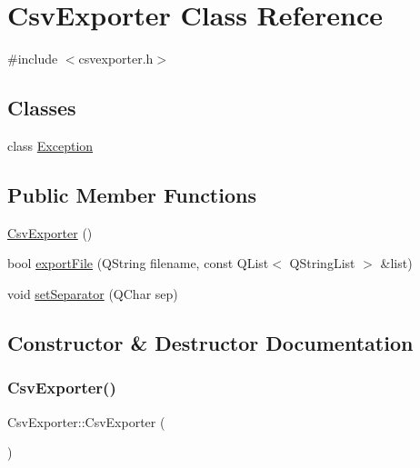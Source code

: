 \hypertarget{class_csv_exporter}{}\section{Csv\+Exporter Class Reference}
\label{class_csv_exporter}


{\ttfamily \#include $<$csvexporter.\+h$>$}

\subsection*{Classes}
\begin{DoxyCompactItemize}
\item 
class \mbox{\hyperlink{class_csv_exporter_1_1_exception}{Exception}}
\end{DoxyCompactItemize}
\subsection*{Public Member Functions}
\begin{DoxyCompactItemize}
\item 
\mbox{\hyperlink{class_csv_exporter_a6d9b9a020544f85501abb99fbd1cbdf3}{Csv\+Exporter}} ()
\item 
bool \mbox{\hyperlink{class_csv_exporter_ae561d65e331f93d250ba61d79b83fa42}{export\+File}} (Q\+String filename, const Q\+List$<$ Q\+String\+List $>$ \&list)
\item 
void \mbox{\hyperlink{class_csv_exporter_a7334513ed99bcb6457806faab7ae6eec}{set\+Separator}} (Q\+Char sep)
\end{DoxyCompactItemize}


\subsection{Constructor \& Destructor Documentation}
\mbox{\label{class_csv_exporter_a6d9b9a020544f85501abb99fbd1cbdf3}} 
\subsubsection{\texorpdfstring{CsvExporter()}{CsvExporter()}}
{\footnotesize\ttfamily Csv\+Exporter\+::\+Csv\+Exporter (\begin{DoxyParamCaption}{ }\end{DoxyParamCaption})}



